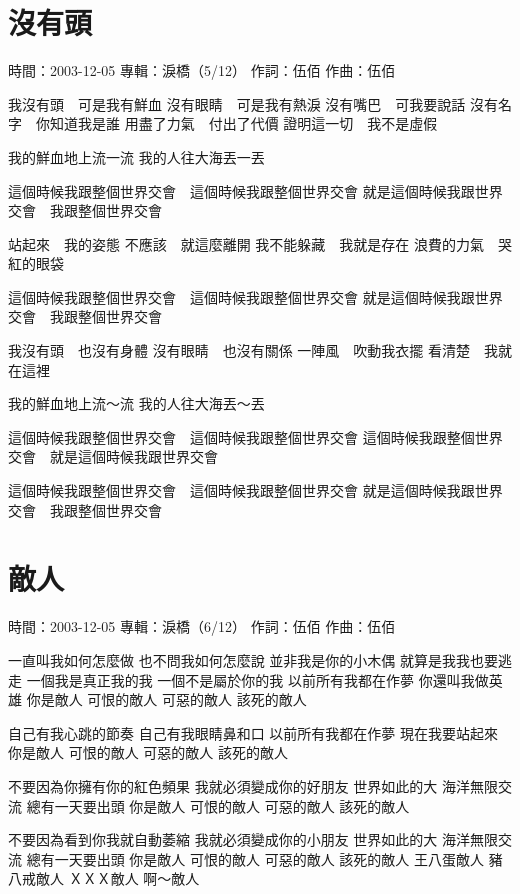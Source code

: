 \documentclass[UTF8,a4paper,oneside,twocolumn,12pt]{ctexbook}
\newcommand{\infopair}[2]{\textbullet #1：#2}
\newcommand{\zc}[1][伍佰]{\infopair{作詞}{#1}}
\newcommand{\zq}[1][伍佰]{\infopair{作曲}{#1}}
\newcommand{\zj}[1]{\infopair{專輯}{#1}}
\newcommand{\sj}[1]{\infopair{時間}{#1}}
\newenvironment{info}{\begin{flushleft}\kaishu
	}
	{\end{flushleft}\normalsize\yahei\par}
\newenvironment{lyric}{
	}
{}
\begin{document}
\section{沒有頭}
\begin{info}
	\sj{2003-12-05}
	\zj{淚橋（5/12）}
	\zc
	\zq
\end{info}
\begin{lyric}
	我沒有頭　可是我有鮮血
	沒有眼睛　可是我有熱淚
	沒有嘴巴　可我要說話
	沒有名字　你知道我是誰
	用盡了力氣　付出了代價
	證明這一切　我不是虛假

	我的鮮血地上流一流
	我的人往大海丟一丟

	這個時候我跟整個世界交會　這個時候我跟整個世界交會
	就是這個時候我跟世界交會　我跟整個世界交會

	站起來　我的姿態
	不應該　就這麼離開
	我不能躲藏　我就是存在
	浪費的力氣　哭紅的眼袋

	這個時候我跟整個世界交會　這個時候我跟整個世界交會
	就是這個時候我跟世界交會　我跟整個世界交會

	我沒有頭　也沒有身體
	沒有眼睛　也沒有關係
	一陣風　吹動我衣擺
	看清楚　我就在這裡

	我的鮮血地上流～流
	我的人往大海丟～丟

	這個時候我跟整個世界交會　這個時候我跟整個世界交會
	這個時候我跟整個世界交會　就是這個時候我跟世界交會

	這個時候我跟整個世界交會　這個時候我跟整個世界交會
	就是這個時候我跟世界交會　我跟整個世界交會
\end{lyric}

\section{敵人}
\begin{info}
	\sj{2003-12-05}
	\zj{淚橋（6/12）}
	\zc
	\zq
\end{info}
\begin{lyric}
	一直叫我如何怎麼做
	也不問我如何怎麼說
	並非我是你的小木偶
	就算是我我也要逃走
	一個我是真正我的我
	一個不是屬於你的我
	以前所有我都在作夢
	你還叫我做英雄
	你是敵人
	可恨的敵人
	可惡的敵人
	該死的敵人

	自己有我心跳的節奏
	自己有我眼睛鼻和口
	以前所有我都在作夢
	現在我要站起來
	你是敵人
	可恨的敵人
	可惡的敵人
	該死的敵人

	不要因為你擁有你的紅色頻果
	我就必須變成你的好朋友
	世界如此的大 海洋無限交流
	總有一天要出頭
	你是敵人
	可恨的敵人
	可惡的敵人
	該死的敵人

	不要因為看到你我就自動萎縮
	我就必須變成你的小朋友
	世界如此的大 海洋無限交流
	總有一天要出頭
	你是敵人
	可恨的敵人
	可惡的敵人
	該死的敵人
	王八蛋敵人
	豬八戒敵人
	ＸＸＸ敵人
	啊～敵人
\end{lyric}
\end{document}
